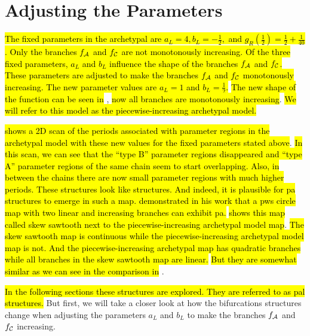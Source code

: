 \section{Adjusting the Parameters}
\label{sec:add.parameters}

\hl{
	The fixed parameters in the archetypal are $a_L = 4, b_L = -\frac{1}{2},$ and $g_R\left(\frac{1}{2}\right) = \frac{1}{2} + \frac{1}{40}$.
	\hl{O}nly the branches $f_{\mathcal{A}}$ and $f_{\mathcal{C}}$ are not monotonously increasing.
	Of the three fixed parameters, $a_L$ and $b_L$ influence the shape of the branches $f_{\mathcal{A}}$ and $f_{\mathcal{C}}$.
	These parameters are adjusted to make the branches $f_{\mathcal{A}}$ and $f_{\mathcal{C}}$ monotonously increasing.
	The new parameter values are $a_L = 1$ and $b_L = \frac{1}{2}$.
}
\hl{The new shape of the function can be seen in} , \hl{now all branches are monotonously increasing}.
\hl{
	We will refer to this model as the piecewise-increasing archetypal model.
}

 \hl{shows a 2D scan of the periods associated with parameter regions in the archetypal model with these new values for the fixed parameters stated above}.
\hl{
	In this scan, we can see that the ``type B'' parameter regions disappeared and ``type A'' parameter regions of the same chain seem to start overlapping.
	Also, in between the chains there are now small parameter regions with much higher periods.
	These structures look like  structures.
	And indeed, it is plausible for \gls{pa} structures to emerge in such a map.
	 demonstrated in his work \cite{simpson2018saw} that a \gls{pws} circle map with two linear and increasing branches can exhibit \gls{pa}.
}
 \hl{shows this map called skew sawtooth next to the piecewise-increasing archetypal model map}.
\hl{
	The skew sawtooth map is continuous while the piecewise-increasing archetypal model map is not.
	And the piecewise-increasing archetypal map has quadratic branches while all branches in the skew sawtooth map are linear.
}
\hl{But they are somewhat similar as we can see in the comparison in} .

\hl{
	In the following sections these structures are explored.
	They are referred to as \gls{pal} structures.
}
But first, we will take a closer look at how the bifurcations structures change when adjusting the parameters $a_L$ and $b_L$ to make the branches $f_{\mathcal{A}}$ and $f_{\mathcal{C}}$ increasing.


